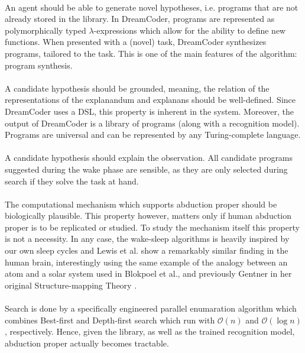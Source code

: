 \paragraph{} An agent should be able to generate novel hypotheses, i.e. programs that are not already stored in the library. In DreamCoder, programs are represented as polymorphically typed $\lambda$-expressions which allow for the ability to define new functions. When presented with a (novel) task, DreamCoder synthesizes programs, tailored to the task. This is one of the main features of the algorithm: program synthesis.

\paragraph{} A candidate hypothesis should be grounded, meaning, the relation of the representations of the explanandum and explanans should be well-defined. Since DreamCoder uses a DSL, this property is inherent in the system. Moreover, the output of DreamCoder is a library of programs (along with a recognition model). Programs are universal and can be represented by any Turing-complete language.

\paragraph{} A candidate hypothesis should explain the observation. All candidate programs suggested during the wake phase are sensible, as they are only selected during search if they solve the task at hand. 

\paragraph{} The computational mechanism which supports abduction proper should be biologically plausible. This property however, matters only if human abduction proper is to be replicated or studied. To study the mechanism itself this property is not a necessity. In any case, the wake-sleep algorithms is heavily inspired by our own sleep cycles and Lewis et al. show a remarkably similar finding in the human brain, interestingly using the same example of the analogy between an atom and a solar system used in Blokpoel et al., and previously Gentner in her original Structure-mapping Theory \cite{lewis2018memory,blokpoel2018deep, gentner1983structure}.

\paragraph{}
Search is done by a specifically engineered parallel enumaration algorithm which combines Best-first and Depth-first search which run with $\mathcal{O}(n)$ and $\mathcal{O}(\log n)$, respectively. Hence, given the library, as well as the trained recognition model, abduction proper actually becomes tractable.





